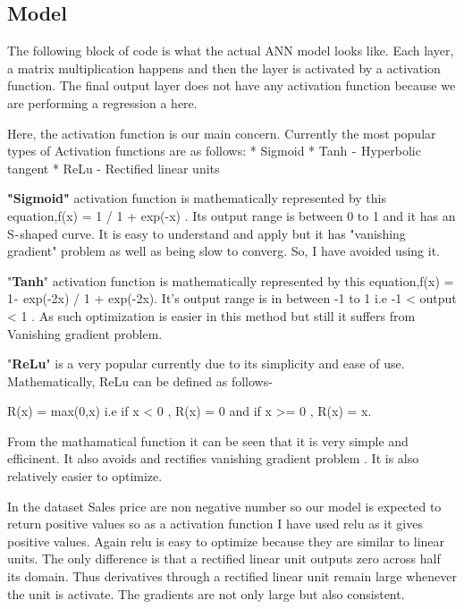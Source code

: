 \documentclass[11pt, a4paper , landscape]{article}
\begin{document}
    \subsection{Model}\label{model}

The following block of code is what the actual ANN model looks like.
Each layer, a matrix multiplication happens and then the layer is
activated by a activation function. The final output layer does not have
any activation function because we are performing a regression a here.

Here, the activation function is our main concern. Currently the most
popular types of Activation functions are as follows: * Sigmoid * Tanh 
-  Hyperbolic tangent * ReLu - Rectified linear units

\textbf{"Sigmoid"} activation function is mathematically represented by
this equation,f(x) = 1 / 1 + exp(-x) . Its output range is between 0 to
1 and it has an S - shaped curve. It is easy to understand and apply but
it has "vanishing gradient" problem as well as being slow to converg.
So, I have avoided using it.

"\textbf{Tanh}" activation function is mathematically represented by
this equation,f(x) = 1 -  exp(-2x) / 1 + exp(-2x). It's output range is
in between -1 to 1 i.e -1 \textless{} output \textless{} 1 . As such
optimization is easier in this method but still it suffers from
Vanishing gradient problem.

"\textbf{ReLu}" is a very popular currently due to its simplicity and
ease of use. Mathematically, ReLu can be defined as follows-

R(x) = max(0,x) i.e if x \textless{} 0 , R(x) = 0 and if x
\textgreater{}= 0 , R(x) = x.

From the mathamatical function it can be seen that it is very simple and
efficinent. It also avoids and rectifies vanishing gradient problem . It
is also relatively easier to optimize.

    In the dataset Sales price are non negative number so our model is
expected to return positive values so as a activation function I have
used relu as it gives positive values. Again relu is easy to optimize
because they are similar to linear units. The only difference is that a
rectified linear unit outputs zero across half its domain. Thus
derivatives through a rectified linear unit remain large whenever the
unit is activate. The gradients are not only large but also consistent.
\end{document}
